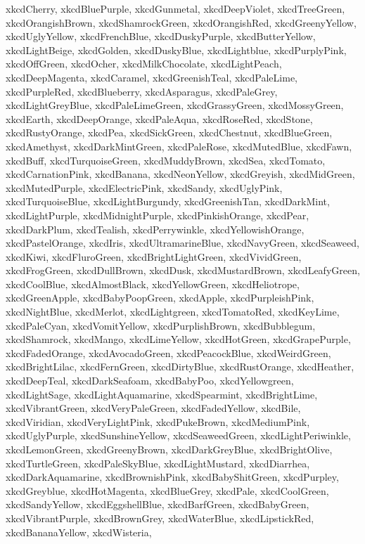 \documentclass[12pt]{article}
\begin{document}
{{xkcdCherry,
xkcdBluePurple,
xkcdGunmetal,
xkcdDeepViolet,
xkcdTreeGreen,
xkcdOrangishBrown,
xkcdShamrockGreen,
xkcdOrangishRed,
xkcdGreenyYellow,
xkcdUglyYellow,
xkcdFrenchBlue,
xkcdDuskyPurple,
xkcdButterYellow,
xkcdLightBeige,
xkcdGolden,
xkcdDuskyBlue,
xkcdLightblue,
xkcdPurplyPink,
xkcdOffGreen,
xkcdOcher,
xkcdMilkChocolate,
xkcdLightPeach,
xkcdDeepMagenta,
xkcdCaramel,
xkcdGreenishTeal,
xkcdPaleLime,
xkcdPurpleRed,
xkcdBlueberry,
xkcdAsparagus,
xkcdPaleGrey,
xkcdLightGreyBlue,
xkcdPaleLimeGreen,
xkcdGrassyGreen,
xkcdMossyGreen,
xkcdEarth,
xkcdDeepOrange,
xkcdPaleAqua,
xkcdRoseRed,
xkcdStone,
xkcdRustyOrange,
xkcdPea,
xkcdSickGreen,
xkcdChestnut,
xkcdBlueGreen,
xkcdAmethyst,
xkcdDarkMintGreen,
xkcdPaleRose,
xkcdMutedBlue,
xkcdFawn,
xkcdBuff,
xkcdTurquoiseGreen,
xkcdMuddyBrown,
xkcdSea,
xkcdTomato,
xkcdCarnationPink,
xkcdBanana,
xkcdNeonYellow,
xkcdGreyish,
xkcdMidGreen,
xkcdMutedPurple,
xkcdElectricPink,
xkcdSandy,
xkcdUglyPink,
xkcdTurquoiseBlue,
xkcdLightBurgundy,
xkcdGreenishTan,
xkcdDarkMint,
xkcdLightPurple,
xkcdMidnightPurple,
xkcdPinkishOrange,
xkcdPear,
xkcdDarkPlum,
xkcdTealish,
xkcdPerrywinkle,
xkcdYellowishOrange,
xkcdPastelOrange,
xkcdIris,
xkcdUltramarineBlue,
xkcdNavyGreen,
xkcdSeaweed,
xkcdKiwi,
xkcdFluroGreen,
xkcdBrightLightGreen,
xkcdVividGreen,
xkcdFrogGreen,
xkcdDullBrown,
xkcdDusk,
xkcdMustardBrown,
xkcdLeafyGreen,
xkcdCoolBlue,
xkcdAlmostBlack,
xkcdYellowGreen,
xkcdHeliotrope,
xkcdGreenApple,
xkcdBabyPoopGreen,
xkcdApple,
xkcdPurpleishPink,
xkcdNightBlue,
xkcdMerlot,
xkcdLightgreen,
xkcdTomatoRed,
xkcdKeyLime,
xkcdPaleCyan,
xkcdVomitYellow,
xkcdPurplishBrown,
xkcdBubblegum,
xkcdShamrock,
xkcdMango,
xkcdLimeYellow,
xkcdHotGreen,
xkcdGrapePurple,
xkcdFadedOrange,
xkcdAvocadoGreen,
xkcdPeacockBlue,
xkcdWeirdGreen,
xkcdBrightLilac,
xkcdFernGreen,
xkcdDirtyBlue,
xkcdRustOrange,
xkcdHeather,
xkcdDeepTeal,
xkcdDarkSeafoam,
xkcdBabyPoo,
xkcdYellowgreen,
xkcdLightSage,
xkcdLightAquamarine,
xkcdSpearmint,
xkcdBrightLime,
xkcdVibrantGreen,
xkcdVeryPaleGreen,
xkcdFadedYellow,
xkcdBile,
xkcdViridian,
xkcdVeryLightPink,
xkcdPukeBrown,
xkcdMediumPink,
xkcdUglyPurple,
xkcdSunshineYellow,
xkcdSeaweedGreen,
xkcdLightPeriwinkle,
xkcdLemonGreen,
xkcdGreenyBrown,
xkcdDarkGreyBlue,
xkcdBrightOlive,
xkcdTurtleGreen,
xkcdPaleSkyBlue,
xkcdLightMustard,
xkcdDiarrhea,
xkcdDarkAquamarine,
xkcdBrownishPink,
xkcdBabyShitGreen,
xkcdPurpley,
xkcdGreyblue,
xkcdHotMagenta,
xkcdBlueGrey,
xkcdPale,
xkcdCoolGreen,
xkcdSandyYellow,
xkcdEggshellBlue,
xkcdBarfGreen,
xkcdBabyGreen,
xkcdVibrantPurple,
xkcdBrownGrey,
xkcdWaterBlue,
xkcdLipstickRed,
xkcdBananaYellow,
xkcdWisteria,
}}
\end{document}
